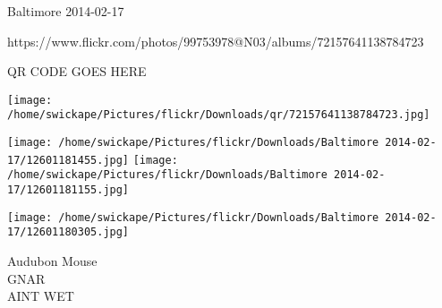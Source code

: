 \documentclass[10pt,letterpaper]{article}
\begin{document}
Baltimore 2014-02-17

https://www.flickr.com/photos/99753978@N03/albums/72157641138784723

QR CODE GOES HERE

\texttt{[image: /home/swickape/Pictures/flickr/Downloads/qr/72157641138784723.jpg]}
\pagebreak

\texttt{[image: /home/swickape/Pictures/flickr/Downloads/Baltimore 2014-02-17/12601181455.jpg]}
\texttt{[image: /home/swickape/Pictures/flickr/Downloads/Baltimore 2014-02-17/12601181155.jpg]}

\texttt{[image: /home/swickape/Pictures/flickr/Downloads/Baltimore 2014-02-17/12601180305.jpg]}

Audubon Mouse\\
GNAR\\
AINT WET\\
\pagebreak
\end{document}
